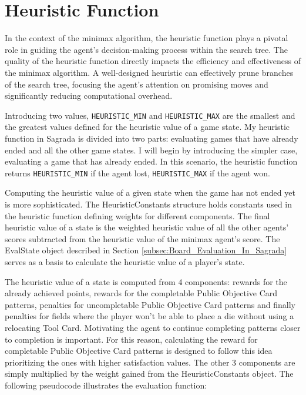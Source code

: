 \section{Heuristic Function} \label{sec:Minimax_Heuristic_Function}

In the context of the minimax algorithm, the heuristic function plays a pivotal role in guiding the agent's decision-making process within the search tree.
The quality of the heuristic function directly impacts the efficiency and effectiveness of the minimax algorithm. A well-designed heuristic can effectively 
prune branches of the search tree, focusing the agent's attention on promising moves and significantly reducing computational overhead. 


Introducing two values, \texttt{HEURISTIC\_MIN} and \texttt{HEURISTIC\_MAX} are the smallest and the greatest values defined for the heuristic value of a game state.
My heuristic function in Sagrada is divided into two parts: evaluating games that have already ended and all the other game states.
I will begin by introducing the simpler case, evaluating a game that has already ended. In this scenario, the heuristic function returns \texttt{HEURISTIC\_MIN} if the agent
lost, \texttt{HEURISTIC\_MAX} if the agent won. 

Computing the heuristic value of a given state when the game has not ended yet is more sophisticated. The HeuristicConstants structure
holds constants used in the heuristic function defining weights for different components. The final heuristic value of a state is the weighted heuristic 
value of all the other agents' scores subtracted from the heuristic value of the minimax agent's score. The EvalState object described in Section \ref{subsec:Board_Evaluation_In_Sagrada}  
serves as a basis to calculate the heuristic value of a player's state. 

The heuristic value of a state is computed from 4 components: rewards for the already achieved points, rewards for the completable Public Objective Card patterns,
penalties for uncompletable Public Objective Card patterns and finally penalties for fields where the player won't be able to place a die without using a relocating Tool Card.
Motivating the agent to continue completing patterns closer to completion is important. For this reason, calculating the reward for completable Public Objective Card patterns 
is designed to follow this idea prioritizing the ones with higher satisfaction values. The other 3 components are simply multiplied by the weight gained from the 
HeuristicConstants object. The following pseudocode illustrates the evaluation function:

